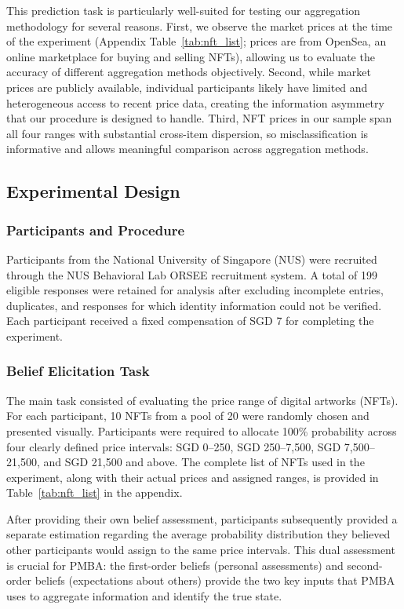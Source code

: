 \documentclass[12pt,reqno]{amsart}
\begin{document}
This prediction task is particularly well-suited for testing our aggregation methodology for several reasons. First, we observe the market prices at the time of the experiment (Appendix Table~\ref{tab:nft_list}; prices are from OpenSea, an online marketplace for buying and selling NFTs), allowing us to evaluate the accuracy of different aggregation methods objectively. Second, while market prices are publicly available, individual participants likely have limited and heterogeneous access to recent price data, creating the information asymmetry that  our procedure is designed to handle. Third, NFT prices in our sample span all four ranges with substantial cross-item dispersion, so misclassification is informative and allows meaningful comparison across aggregation methods.

\subsection{Experimental Design}

\subsubsection{Participants and Procedure}
Participants from the National University of Singapore (NUS) were recruited through the NUS Behavioral Lab ORSEE recruitment system. A total of 199 eligible responses were retained for analysis after excluding incomplete entries, duplicates, and responses for which identity information could not be verified. Each participant received a fixed compensation of SGD 7 for completing the experiment.

\subsubsection{Belief Elicitation Task}
The main task consisted of evaluating the price range of digital artworks (NFTs). For each participant, 10 NFTs from a pool of 20 were randomly chosen and presented visually. Participants were required to allocate 100\% probability across four clearly defined price intervals: SGD 0--250, SGD 250--7,500, SGD 7,500--21,500, and SGD 21,500 and above. The complete list of NFTs used in the experiment, along with their actual prices and assigned ranges, is provided in Table~\ref{tab:nft_list} in the appendix.

After providing their own belief assessment, participants subsequently provided a separate estimation regarding the average probability distribution they believed other participants would assign to the same price intervals. This dual assessment is crucial for PMBA: the first-order beliefs (personal assessments) and second-order beliefs (expectations about others) provide the two key inputs that PMBA uses to aggregate information and identify the true state.
\end{document}
